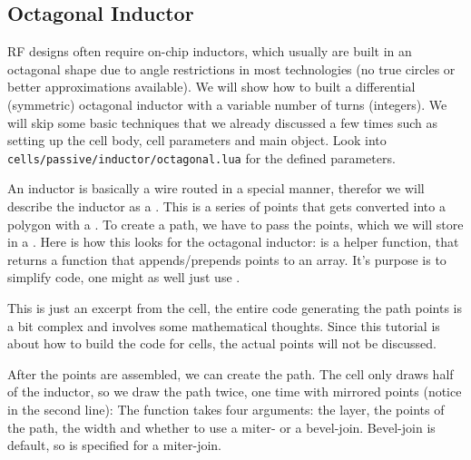 \subsection{Octagonal Inductor}
RF designs often require on-chip inductors, which usually are built in an octagonal shape due to angle restrictions in most technologies (no true circles or
better approximations available). We will show how to built a differential (symmetric) octagonal inductor with a variable number of turns (integers). We will
skip some basic techniques that we already discussed a few times such as setting up the cell body, cell parameters and main object. Look into
\texttt{cells/passive/inductor/octagonal.lua} for the defined parameters.

An inductor is basically a wire routed in a special manner, therefor we will describe the inductor as a . This is a series of points that gets
converted into a polygon with a . To create a path, we have to pass the points, which we will store in a . Here is how this looks
for the octagonal inductor: 
 is a helper function, that returns a function that appends/prepends points to an array. It's purpose is to simplify code, one
might as well just use .

This is just an excerpt from the cell, the entire code generating the path points is a bit complex and involves some mathematical thoughts. Since this tutorial is
about how to build the code for cells, the actual points will not be discussed.

After the points are assembled, we can create the path. The cell only draws half of the inductor, so we draw the path twice, one time with mirrored points (notice
 in the second line):
The  function takes four arguments: the layer, the points of the path, the width and whether to use a miter- or a bevel-join. Bevel-join is
default, so  is specified for a miter-join.

